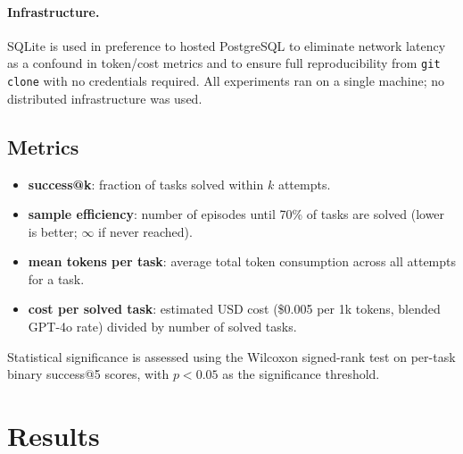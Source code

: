 \documentclass{article}
\begin{document}
\paragraph{Infrastructure.} SQLite is used in preference to hosted PostgreSQL
to eliminate network latency as a confound in token/cost metrics and to ensure
full reproducibility from \texttt{git clone} with no credentials required. All
experiments ran on a single machine; no distributed infrastructure was used.

\subsection{Metrics}

\begin{itemize}
  \item \textbf{success@k}: fraction of tasks solved within $k$ attempts.
  \item \textbf{sample efficiency}: number of episodes until 70\% of tasks
    are solved (lower is better; $\infty$ if never reached).
  \item \textbf{mean tokens per task}: average total token consumption across
    all attempts for a task.
  \item \textbf{cost per solved task}: estimated USD cost
    (\$0.005 per 1k tokens, blended GPT-4o rate) divided by number of solved tasks.
\end{itemize}

Statistical significance is assessed using the Wilcoxon signed-rank test on
per-task binary success@5 scores, with $p < 0.05$ as the significance threshold.

\section{Results}
\label{sec:results}
\end{document}
